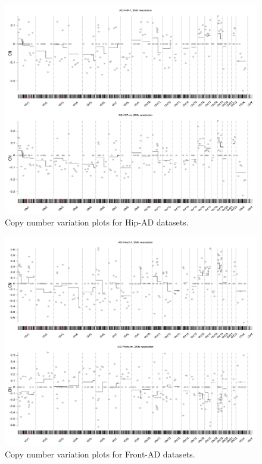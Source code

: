 \begin{figure}[!ht] 
    \centerline{\includegraphics[width = 13cm]{Figures/CNV/cnv5.jpg}}
\caption{Copy number variation plots for Hip-AD datasets.}
\label{fig:cnv-hip}
\end{figure}

\begin{figure}[!ht] 
    \centerline{\includegraphics[width = 13cm]{Figures/CNV/cnv6.jpg}}
\caption{Copy number variation plots for Front-AD datasets.}
\label{fig:cnv-front}
\end{figure}


